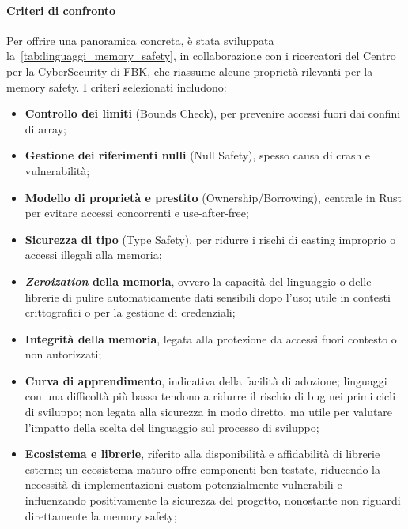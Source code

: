 \paragraph{Criteri di confronto}
Per offrire una panoramica concreta, è stata sviluppata la~\autoref{tab:linguaggi_memory_safety},
in collaborazione con i ricercatori del Centro per la CyberSecurity di FBK\footnotemark,
che riassume alcune proprietà rilevanti per la memory safety. I criteri selezionati
includono:
\begin{itemize}
  \item \textbf{Controllo dei limiti} (Bounds Check), per prevenire accessi fuori
    dai confini di array;

  \item \textbf{Gestione dei riferimenti nulli} (Null Safety), spesso causa di crash
    e vulnerabilità;

  \item \textbf{Modello di proprietà e prestito} (Ownership/Borrowing), centrale
    in Rust per evitare accessi concorrenti e use-after-free;

  \item \textbf{Sicurezza di tipo} (Type Safety), per ridurre i rischi di casting
    improprio o accessi illegali alla memoria;

  \item \textbf{\textit{Zeroization} della memoria}, ovvero la capacità del linguaggio
    o delle librerie di pulire automaticamente dati sensibili dopo l'uso; utile
    in contesti crittografici o per la gestione di credenziali;

  \item \textbf{Integrità della memoria}, legata alla protezione da accessi fuori
    contesto o non autorizzati;

  \item \textbf{Curva di apprendimento}, indicativa della facilità di adozione;
    linguaggi con una difficoltà più bassa tendono a ridurre il rischio di bug
    nei primi cicli di sviluppo; non legata alla sicurezza in modo diretto, ma
    utile per valutare l'impatto della scelta del linguaggio sul processo di
    sviluppo;

  \item \textbf{Ecosistema e librerie}, riferito alla disponibilità e affidabilità
    di librerie esterne; un ecosistema maturo offre componenti ben testate, riducendo
    la necessità di implementazioni custom potenzialmente vulnerabili e influenzando
    positivamente la sicurezza del progetto, nonostante non riguardi
    direttamente la memory safety;
\end{itemize}

